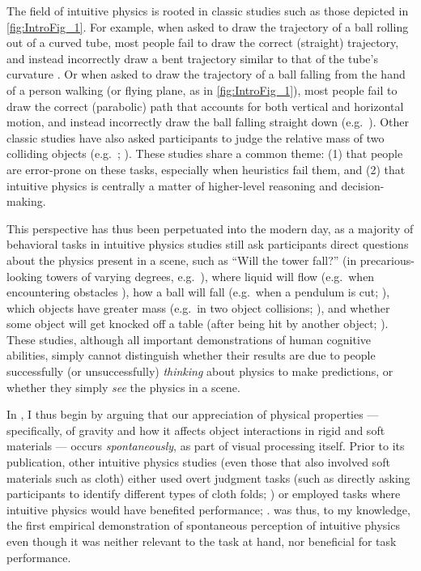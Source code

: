 The field of intuitive physics is rooted in classic studies such as those depicted in \cref{fig:IntroFig_1}.  For example, when asked to draw the trajectory of a ball rolling out of a curved tube, most people fail to draw the correct (straight) trajectory, and instead incorrectly draw a bent trajectory similar to that of the tube’s curvature \parencite{mccloskey_curvilinear_1980, kaiser_intuitive_1986}.  Or when asked to draw the trajectory of a ball falling from the hand of a person walking (or flying plane, as in \cref{fig:IntroFig_1}), most people fail to draw the correct (parabolic) path that accounts for both vertical and horizontal motion, and instead incorrectly draw the ball falling straight down (e.g.~\cite{mccloskey_alone_1983, mccloskey_etal_1983}).  Other classic studies have also asked participants to judge the relative mass of two colliding objects (e.g.~\cite{gilden_understanding_1989}; \cite{todd_visual_1982}).  These studies share a common theme: (1) that people are error-prone on these tasks, especially when heuristics fail them, and (2) that intuitive physics is centrally a matter of higher-level reasoning and decision-making.  

This perspective has thus been perpetuated into the modern day, as a majority of behavioral tasks in intuitive physics studies still ask participants direct questions about the physics present in a scene, such as “Will the tower fall?” (in precarious-looking towers of varying degrees, e.g.~\cite{battaglia_simulation_2013, hamrick_inferring_2016, mitko_when_2020}), where liquid will flow (e.g.~when encountering obstacles \cite{bates_humans_2015}), how a ball will fall (e.g.~when a pendulum is cut; \cite{smith_different_2018}), which objects have greater mass (e.g.~in two object collisions; \cite{jacobs_learning_2000,jacobs_learning_2001}), and whether some object will get knocked off a table (after being hit by another object; \cite{mitko_dedicated_2024}).  These studies, although all important demonstrations of human cognitive abilities, simply cannot distinguish whether their results are due to people successfully (or unsuccessfully) \textit{thinking} about physics to make predictions, or whether they simply \textit{see} the physics in a scene.

In , I thus begin by arguing that our appreciation of physical properties --- specifically, of gravity and how it affects object interactions in rigid and soft materials --- occurs \textit{spontaneously}, as part of visual processing itself.  Prior to its publication, other intuitive physics studies (even those that also involved soft materials such as cloth) either used overt judgment tasks (such as directly asking participants to identify different types of cloth folds; \cite{phillips_veiled_2020}) or employed tasks where intuitive physics would have benefited performance; \parencite{little_whats_2020}.   was thus, to my knowledge, the first empirical demonstration of spontaneous perception of intuitive physics even though it was neither relevant to the task at hand, nor beneficial for task performance. 

